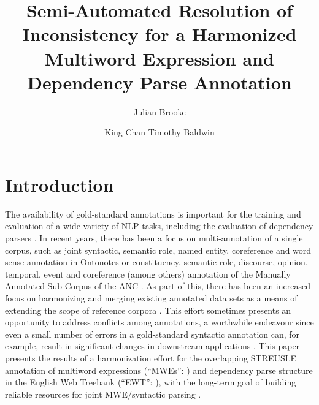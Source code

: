 \documentclass[output=paper
,modfonts
,nonflat]{langsci/langscibook}
\title{Semi-Automated Resolution of Inconsistency for a Harmonized Multiword Expression and Dependency Parse Annotation}
\author{%
 Julian Brooke\affiliation{The University of Melbourne}\and 
 King Chan\affiliation{The University of Melbourne}\lastand 
 Timothy Baldwin \affiliation{The University of Melbourne}
}
\begin{document}
\maketitle

\section{Introduction}

The availability of gold-standard annotations is important for the training and evaluation of a wide variety of NLP tasks, including the evaluation of dependency parsers \citep{Buchholz:2006:CST:1596276.1596305}. In recent years, there has been a focus on multi-annotation of a single corpus, such as joint syntactic, semantic role, named entity, coreference and word sense annotation in Ontonotes \citep{Hovy+:2006} or constituency, semantic role, discourse, opinion, temporal, event and coreference (among others) annotation of the Manually Annotated Sub-Corpus of the ANC \citep{Ide+:2010}. As part of this, there has been an increased focus on harmonizing and merging existing annotated data sets as a means of extending the scope of reference corpora \citep{Ide:2007:GGF:1642059.1642060,Declerk08,SimiMB15}.  This effort sometimes presents an opportunity to address conflicts among annotations, a worthwhile endeavour since even a small number of errors in a gold-standard syntactic annotation can, for example, result in significant changes in downstream applications \citep{habash2007determining}. This paper presents the results of a harmonization effort for the overlapping STREUSLE annotation \citep{schneider2014} of multiword expressions (``MWEs'': \citet{baldwin2010multiword}) and dependency parse structure in the English Web Treebank (``EWT'': \citet{EWT}), with the long-term goal of building reliable resources for joint MWE/syntactic parsing \citep{constant-nivre:acl:2016}.
\end{document}
